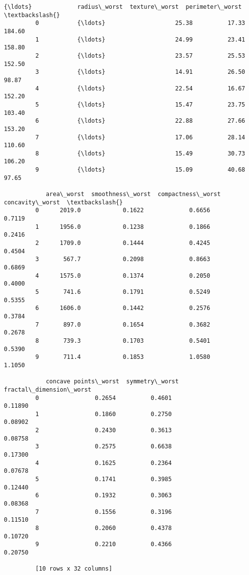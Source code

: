 \documentclass[11pt]{article}
\begin{document}
\begin{Verbatim}[commandchars=\\\{\}]
                     {\ldots}             radius\_worst  texture\_worst  perimeter\_worst  \textbackslash{}
         0           {\ldots}                    25.38          17.33           184.60   
         1           {\ldots}                    24.99          23.41           158.80   
         2           {\ldots}                    23.57          25.53           152.50   
         3           {\ldots}                    14.91          26.50            98.87   
         4           {\ldots}                    22.54          16.67           152.20   
         5           {\ldots}                    15.47          23.75           103.40   
         6           {\ldots}                    22.88          27.66           153.20   
         7           {\ldots}                    17.06          28.14           110.60   
         8           {\ldots}                    15.49          30.73           106.20   
         9           {\ldots}                    15.09          40.68            97.65   
         
            area\_worst  smoothness\_worst  compactness\_worst  concavity\_worst  \textbackslash{}
         0      2019.0            0.1622             0.6656           0.7119   
         1      1956.0            0.1238             0.1866           0.2416   
         2      1709.0            0.1444             0.4245           0.4504   
         3       567.7            0.2098             0.8663           0.6869   
         4      1575.0            0.1374             0.2050           0.4000   
         5       741.6            0.1791             0.5249           0.5355   
         6      1606.0            0.1442             0.2576           0.3784   
         7       897.0            0.1654             0.3682           0.2678   
         8       739.3            0.1703             0.5401           0.5390   
         9       711.4            0.1853             1.0580           1.1050   
         
            concave points\_worst  symmetry\_worst  fractal\_dimension\_worst  
         0                0.2654          0.4601                  0.11890  
         1                0.1860          0.2750                  0.08902  
         2                0.2430          0.3613                  0.08758  
         3                0.2575          0.6638                  0.17300  
         4                0.1625          0.2364                  0.07678  
         5                0.1741          0.3985                  0.12440  
         6                0.1932          0.3063                  0.08368  
         7                0.1556          0.3196                  0.11510  
         8                0.2060          0.4378                  0.10720  
         9                0.2210          0.4366                  0.20750  
         
         [10 rows x 32 columns]
\end{Verbatim}
            
\end{document}
